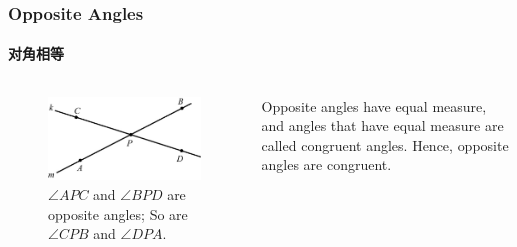\documentclass[
	11pt, %
	handout,
]{beamer}
\begin{document}

\begin{frame}
	\frametitle{Opposite Angles} %
	\framesubtitle{对角相等}
	\begin{columns}[t] 
		\begin{column}{0.4\textwidth} %
			\begin{figure}
				\includegraphics[width=\linewidth]{Angles.jpg}
				\caption{$\angle APC$ and $\angle BPD$ are opposite angles; So are  $\angle CPB$ and $\angle DPA$.}
			\end{figure}
		\end{column}

	\begin{column}{0.6\textwidth} %
		\begin{definition}
		Opposite angles have equal measure, and angles that have equal measure are called congruent angles. Hence, \alert{opposite angles are congruent}.
		\end{definition}
	\end{column}
	\end{columns}
\end{frame}

\end{document}
